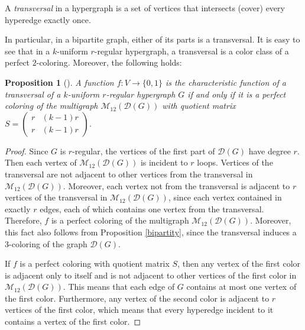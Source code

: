 \documentclass[11pt]{article}
\newtheorem{claim}{Proposition}[section]
\theoremstyle{definition}
\begin{document}
{{{%
A {\sl transversal}  in a hypergraph is a set of vertices that intersects (cover) every  hyperedge exactly once.

In particular, in a bipartite graph, either of its
parts is a transversal. It is easy to see that in a $k$-uniform $r$-regular
hypergraph, a transversal is a color class of a perfect $2$-coloring. Moreover, the following holds:

\begin{claim}[\cite{PA20}]\label{bipartity1}
A function $f:V\rightarrow \{0,1\}$ is the characteristic function of a transversal
of a $k$-uniform $r$-regular
hypergraph
$G$ if and only if it is a perfect coloring of the multigraph
$\mathcal{M}_{12}(\mathcal{D}(G))$ with quotient matrix
$S=\begin{pmatrix}
r & (k-1)r \\
r & (k-1)r
\end{pmatrix}$.
\end{claim}
\begin{proof}
Since $G$ is $r$-regular, the vertices of the first part
of $\mathcal{D}(G)$ have degree $r$. Then each vertex
of  $\mathcal{M}_{12}(\mathcal{D}(G))$ is incident to $r$
loops. Vertices of the transversal are not adjacent to other vertices from the transversal in $\mathcal{M}_{12}(\mathcal{D}(G))$. Moreover,
each vertex not from the transversal is adjacent to $r$ vertices of the transversal in 
$\mathcal{M}_{12}(\mathcal{D}(G))$,
since each vertex contained in exactly $r$ edges, each of which
contains one vertex from the transversal. Therefore, $f$ is a
perfect coloring of the multigraph
$\mathcal{M}_{12}(\mathcal{D}(G))$. Moreover, this fact also follows from Proposition \ref{bipartity}, since the transversal
induces a $3$-coloring of the graph $\mathcal{D}(G)$.





If $f$ is a perfect coloring with quotient matrix
$S$, then any vertex of the first color is adjacent only to  itself  and is not
adjacent to other vertices of the first color in 
$\mathcal{M}_{12}(\mathcal{D}(G))$. This means that each edge of 
$G$ contains at most one vertex of the first color. Furthermore, any vertex
of the second color is  adjacent to $r$ vertices of the first color, which means that every
hyperedge incident to it contains a vertex of the first color.
\end{proof}


}}}
\end{document}
